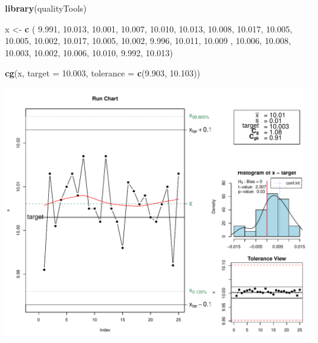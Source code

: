 \documentclass[
]{book}
\newenvironment{Shaded}{\begin{snugshade}}{\end{snugshade}}
\newcommand{\AttributeTok}[1]{\textcolor[rgb]{0.13,0.29,0.53}{#1}}
\newcommand{\FloatTok}[1]{\textcolor[rgb]{0.00,0.00,0.81}{#1}}
\newcommand{\FunctionTok}[1]{\textcolor[rgb]{0.13,0.29,0.53}{\textbf{#1}}}
\newcommand{\NormalTok}[1]{#1}
\newcommand{\OtherTok}[1]{\textcolor[rgb]{0.56,0.35,0.01}{#1}}
\begin{document}
\begin{Shaded}
\begin{Highlighting}[]
\FunctionTok{library}\NormalTok{(qualityTools)}

\NormalTok{x }\OtherTok{\textless{}{-}} \FunctionTok{c}\NormalTok{ ( }\FloatTok{9.991}\NormalTok{, }\FloatTok{10.013}\NormalTok{, }\FloatTok{10.001}\NormalTok{, }\FloatTok{10.007}\NormalTok{, }\FloatTok{10.010}\NormalTok{, }\FloatTok{10.013}\NormalTok{, }\FloatTok{10.008}\NormalTok{, }\FloatTok{10.017}\NormalTok{, }\FloatTok{10.005}\NormalTok{, }\FloatTok{10.005}\NormalTok{, }\FloatTok{10.002}\NormalTok{,}
        \FloatTok{10.017}\NormalTok{, }\FloatTok{10.005}\NormalTok{, }\FloatTok{10.002}\NormalTok{, }\FloatTok{9.996}\NormalTok{, }\FloatTok{10.011}\NormalTok{, }\FloatTok{10.009}\NormalTok{ , }\FloatTok{10.006}\NormalTok{, }\FloatTok{10.008}\NormalTok{, }\FloatTok{10.003}\NormalTok{, }\FloatTok{10.002}\NormalTok{, }\FloatTok{10.006}\NormalTok{, }
        \FloatTok{10.010}\NormalTok{, }\FloatTok{9.992}\NormalTok{, }\FloatTok{10.013}\NormalTok{)}

\FunctionTok{cg}\NormalTok{(x, }\AttributeTok{target =} \FloatTok{10.003}\NormalTok{, }\AttributeTok{tolerance =} \FunctionTok{c}\NormalTok{(}\FloatTok{9.903}\NormalTok{, }\FloatTok{10.103}\NormalTok{))}
\end{Highlighting}
\end{Shaded}

\begin{center}\includegraphics{Libro_TidyQualityTools_files/figure-latex/unnamed-chunk-80-1} \end{center}
\end{document}

